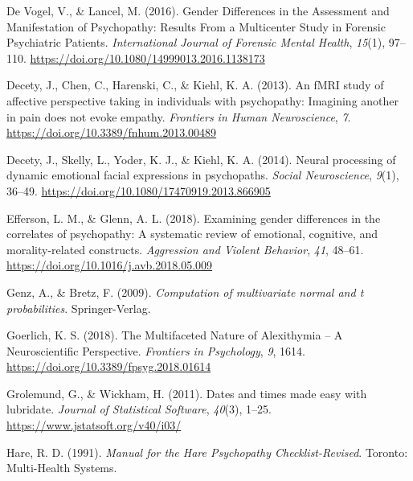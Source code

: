 \documentclass[
  man,floatsintext]{apa7}
\newlength{\cslhangindent}
\newlength{\cslentryspacingunit} %
\newenvironment{CSLReferences}[2] %
 {%
  \setlength{\parindent}{0pt}
  \ifodd #1
  \let\oldpar\par
  \def\par{\hangindent=\cslhangindent\oldpar}
  \fi
  \setlength{\parskip}{#2\cslentryspacingunit}
 }%
 {}
\begin{document}
\begin{CSLReferences}{1}{0}
\leavevmode{}%
De Vogel, V., \& Lancel, M. (2016). Gender {Differences} in the {Assessment} and {Manifestation} of {Psychopathy}: {Results From} a {Multicenter Study} in {Forensic Psychiatric Patients}. \emph{International Journal of Forensic Mental Health}, \emph{15}(1), 97--110. \url{https://doi.org/10.1080/14999013.2016.1138173}

\leavevmode{}%
Decety, J., Chen, C., Harenski, C., \& Kiehl, K. A. (2013). An {fMRI} study of affective perspective taking in individuals with psychopathy: Imagining another in pain does not evoke empathy. \emph{Frontiers in Human Neuroscience}, \emph{7}. \url{https://doi.org/10.3389/fnhum.2013.00489}

\leavevmode{}%
Decety, J., Skelly, L., Yoder, K. J., \& Kiehl, K. A. (2014). Neural processing of dynamic emotional facial expressions in psychopaths. \emph{Social Neuroscience}, \emph{9}(1), 36--49. \url{https://doi.org/10.1080/17470919.2013.866905}

\leavevmode{}%
Efferson, L. M., \& Glenn, A. L. (2018). Examining gender differences in the correlates of psychopathy: {A} systematic review of emotional, cognitive, and morality-related constructs. \emph{Aggression and Violent Behavior}, \emph{41}, 48--61. \url{https://doi.org/10.1016/j.avb.2018.05.009}

\leavevmode{}%
Genz, A., \& Bretz, F. (2009). \emph{Computation of multivariate normal and t probabilities}. Springer-Verlag.

\leavevmode{}%
Goerlich, K. S. (2018). The {Multifaceted Nature} of {Alexithymia} -- {A Neuroscientific Perspective}. \emph{Frontiers in Psychology}, \emph{9}, 1614. \url{https://doi.org/10.3389/fpsyg.2018.01614}

\leavevmode{}%
Grolemund, G., \& Wickham, H. (2011). Dates and times made easy with {lubridate}. \emph{Journal of Statistical Software}, \emph{40}(3), 1--25. \url{https://www.jstatsoft.org/v40/i03/}

\leavevmode{}%
Hare, R. D. (1991). \emph{Manual for the {Hare Psychopathy Checklist-Revised}}. {Toronto: Multi-Health Systems}.


\end{CSLReferences}
\end{document}
